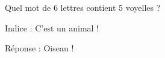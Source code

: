 \documentclass{beamer}
\begin{document}
\begin{frame}[label=question]
Quel mot de 6 lettres contient 5 voyelles ?\\
\hyperlink{indice}{}
\hyperlink{reponse}{}
\end{frame}

\begin{frame}[label=indice]
Indice : C'est un animal !\\
\hyperlink{question}{}
\hyperlink{reponse}{}
\end{frame}

\begin{frame}[label=reponse]
Réponse : Oiseau !\\
\hyperlink{question}{}
\end{frame}
\end{document}
